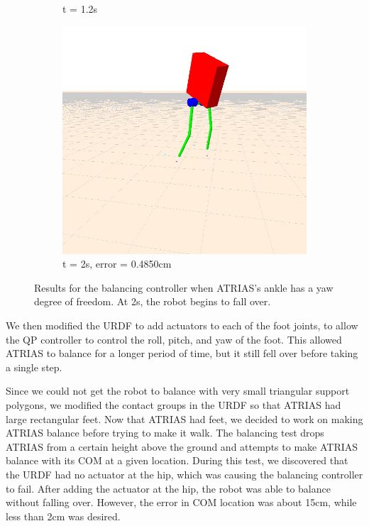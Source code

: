 \documentclass[letterpaper, 10 pt, conference]{ieeeconf}  %
\begin{document}
\begin{figure}[tbp]
\begin{subfigure}[b]{0.3\textwidth}
        \caption{t = 1.2s}
        \label{fig:balanceYaw2}
    \end{subfigure} \hfill
    \begin{subfigure}[b]{0.3\textwidth}
      \centering
        \includegraphics[width=\textwidth] {figures/balanceYaw3.jpg}
        \caption{t = 2s, error = 0.4850cm}
        \label{fig:balanceYaw3}
    \end{subfigure}
  \caption{Results for the balancing controller when ATRIAS's ankle has a yaw degree of freedom. At 2s, the robot begins to fall over.}
  \label{fig:balancing}
\end{figure}

We then modified the URDF to add actuators to each of the foot joints, to allow the QP controller to control the roll, pitch, and yaw of the foot. This allowed ATRIAS to balance for a longer period of time, but it still fell over before taking a single step. 

Since we could not get the robot to balance with very small triangular support polygons, we modified the contact groups in the URDF so that ATRIAS had large rectangular feet. Now that ATRIAS had feet, we decided to work on making ATRIAS balance before trying to make it walk. The balancing test drops ATRIAS from a certain height above the ground and attempts to make ATRIAS balance with its COM at a given location. During this test, we discovered that the URDF had no actuator at the hip, which was causing the balancing controller to fail. After adding the actuator at the hip, the robot was able to balance without falling over. However, the error in COM location was about 15cm, while less than 2cm was desired. 
\end{document}
